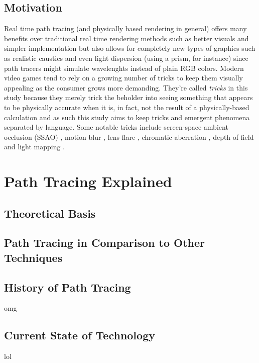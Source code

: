 \documentclass[
  twoside,
  11pt, a4paper,
  footinclude=true,
  headinclude=true,
  cleardoublepage=empty
]{scrreprt}
\begin{document}
\section{Motivation}
Real time path tracing (and physically based rendering in general) offers many
benefits over traditional real time rendering methods such as better visuals
and simpler implementation but also allows for completely new types of graphics
such as realistic caustics \cite{wiki:caustics} and even light dispersion
\cite{wiki:dispersion} (using a prism, for instance) since path tracers might simulate wavelenghts
instead of plain RGB colors. Modern video games tend
to rely on a growing number of tricks to keep them visually appealing as the
consumer grows more demanding. They're called \textit{tricks} in this study
because they merely trick the beholder into seeing something that appears to be
physically accurate when it is, in fact, not the result of a physically-based
calculation and as such this study aims to keep tricks and emergent phenomena
separated by language. Some notable tricks include screen-space ambient occlusion (SSAO)
\cite{wiki:ssao}, motion blur \cite{wiki:motion-blur}, lens flare
\cite{wiki:lens-flare}, chromatic aberration \cite{wiki:chromatic-aberration},
depth of field \cite{wiki:depth-of-field} and light mapping \cite{wiki:lightmap}.

\chapter{Path Tracing Explained}
\lipsum[1]

\section{Theoretical Basis}
\lipsum[1]

\section{Path Tracing in Comparison to Other Techniques}
\lipsum[1]

\section{History of Path Tracing}
omg

\section{Current State of Technology}
lol
\lipsum[1]
\end{document}
